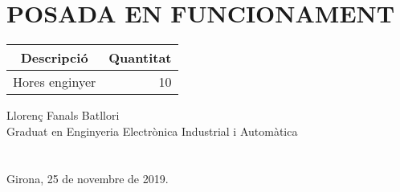 \chapter{\uppercase{Posada en funcionament}}

\begin{table}[H]
  \begin{center}
    \begin{tabularx} {\textwidth} {|X|r|} \hline
  \multicolumn{1}{|c|}{Descripció} &  \multicolumn{1}{c|}{Quantitat}\\ \hline \hline
    Hores enginyer & 10 \\ \hline
    \end{tabularx}%
  \end{center}

  \label{tab:addlabel}%
\end{table}%


\vspace*{\fill}
\noindent Llorenç Fanals Batllori\\
Graduat en Enginyeria Electrònica Industrial i Automàtica\\
\\
\\
Girona, 25 de novembre de 2019.



\clearpage